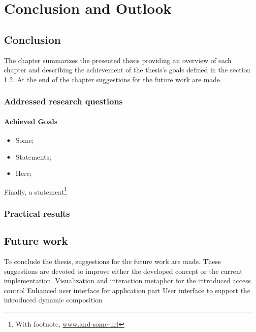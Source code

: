 \chapter{Conclusion and Outlook}

\section{Conclusion}
The chapter summarizes the presented thesis providing an overview of each chapter
and describing the achievement of the thesis’s goals defined in the section 1.2. At
the end of the chapter suggestions for the future work are made.
\subsection{Addressed research questions}

\subsubsection{Achieved Goals}

\begin{itemize}
\item Some;
\item Statements;
\item Here;
\end{itemize}

Finally, a statement\footnote{With footnote, \url{www.and-some-url}}

\subsection{Practical results}

\section{Future work}
To conclude the thesis, suggestions for the future work are made. These suggestions
are devoted to improve either the developed concept or the current implementation.
\newline
Visualization and interaction metaphor for the introduced access control
\newline
Enhanced user interface for application part
\newline
User interface to support the introduced dynamic composition
